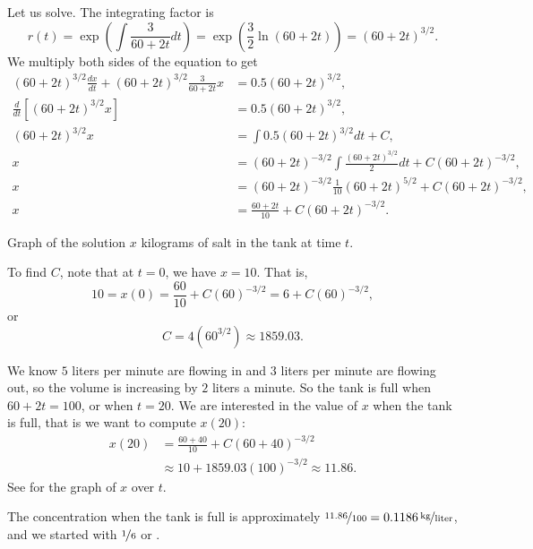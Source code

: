 \begin{example}
Let us solve.  The integrating factor is
\begin{equation*}
r(t) = \exp \left( \int \frac{3}{60+2t} dt  \right)
=
\exp \left( \frac{3}{2} \ln (60+2t) \right)
=
{(60+2t)}^{3/2} .
\end{equation*}
We multiply both sides of the equation to get
\begin{align*}
{(60+2t)}^{3/2} \frac{dx}{dt} +
{(60+2t)}^{3/2} \frac{3}{60+2t} x
& =
0.5{(60+2t)}^{3/2} ,\\
\frac{d}{dt}\left[
{(60+2t)}^{3/2} x \right]
& =
0.5{(60+2t)}^{3/2} ,\\
{(60+2t)}^{3/2} x
& =
\int 
0.5{(60+2t)}^{3/2}
dt
+C ,\\
 x
& =
{(60+2t)}^{-3/2} \int 
\frac{
{(60+2t)}^{3/2}
}{2}
dt
+C{(60+2t)}^{-3/2} ,\\
 x
& =
{(60+2t)}^{-3/2}
\frac{1}{10}{(60+2t)}^{5/2}
+C{(60+2t)}^{-3/2} ,\\
 x
& =
\frac{60+2t}{10}
+C{(60+2t)}^{-3/2} .
\end{align*}

\begin{mywrapfig}{3.25in}
\capstart
{}
\caption{Graph of the solution $x$ kilograms of salt in the tank at time
$t$.\label{linear-salt-graph:fig}}
\end{mywrapfig}
%
%
To find $C$, note that at $t=0$, we have $x=10$.  That is,
\begin{equation*}
10 = x(0)
=
\frac{60}{10}
+C{(60)}^{-3/2}
=
6
+C{(60)}^{-3/2} ,
\end{equation*}
or
\begin{equation*}
C=4 ({60}^{3/2}) \approx 1859.03 .
\end{equation*}

We know $5$ liters per minute are flowing in and $3$ liters per minute are flowing out,
so the volume is increasing by $2$ liters a minute.
So the tank is
full when $60+2t = 100$, or when $t=20$.
We are interested in the value of $x$ when the tank is full,
that is we want to compute $x(20)$:
\begin{equation*}
\begin{split}
x(20) & = 
\frac{60+40}{10}
+C{(60+40)}^{-3/2}
\\
& \approx
10
+1859.03 {(100)}^{-3/2}
\approx
11.86 .
\end{split}
\end{equation*}
See  for the graph of $x$ over $t$.

The concentration when the tank is full is approximately
$\nicefrac{11.86}{100} = \unitfrac[0.1186]{kg}{liter}$, and we started
with $\nicefrac{1}{6}$ or .
\end{example}

